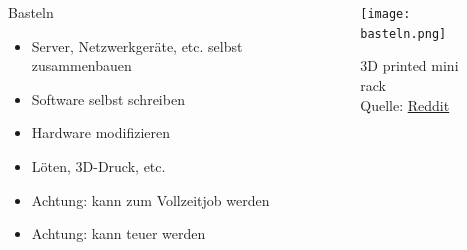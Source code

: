 \documentclass[
    ngerman,
    accentcolor=3b,
    fontsize= 12pt,
    a4paper,
    aspectratio=169,
    colorback=true,
    fancy_row_colors,
    leqno,
    fleqn,
    boxarc=3pt,
    fleqn,
    main,
    design=2008,
]{algoslides}
\begin{document}
    \begin{frame}
        \slidehead{}
        \begin{columns}
            \begin{column}{.5\textwidth}
                Basteln
                \begin{itemize}
                    \item Server, Netzwerkgeräte, etc. selbst zusammenbauen
                    \item Software selbst schreiben
                    \item Hardware modifizieren
                    \item Löten, 3D-Druck, etc.
                    \item Achtung: kann zum Vollzeitjob werden
                    \item Achtung: kann teuer werden
                \end{itemize}
            \end{column}%
            \begin{column}{.5\textwidth}
                \begin{figure}[ht!]
                    \centering
                    \texttt{[image: basteln.png]}
                    \caption{3D printed mini rack\\Quelle: \href{https://www.reddit.com/r/homelab/comments/lqr1gy/monty_3d_printed_mini_rack/}{Reddit}}
                    \label{fig:basteln}

                \end{figure}
            \end{column}%
        \end{columns}
    \end{frame}
\end{document}
